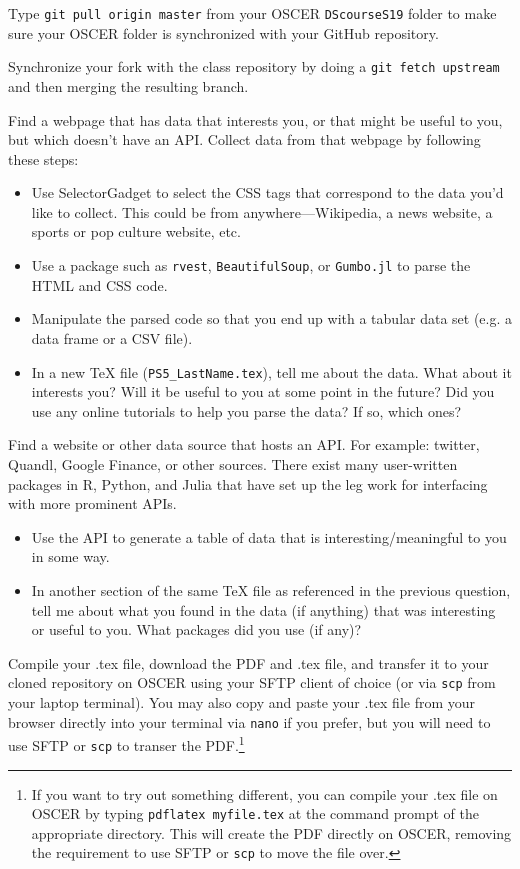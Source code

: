 \documentclass[12pt,english]{exam}
\begin{document}
\begin{questions}
\question Type \texttt{git pull origin master} from your OSCER \texttt{DScourseS19} folder to make sure your OSCER folder is synchronized with your GitHub repository. 

\question Synchronize your fork with the class repository by doing a \texttt{git fetch upstream} and then merging the resulting branch. 

\question Find a webpage that has data that interests you, or that might be useful to you, but which doesn't have an API. Collect data from that webpage by following these steps:
\begin{itemize}
    \item Use SelectorGadget to select the CSS tags that correspond to the data you'd like to collect. This could be from anywhere---Wikipedia, a news website, a sports or pop culture website, etc.
    \item Use a package such as \texttt{rvest}, \texttt{BeautifulSoup}, or \texttt{Gumbo.jl} to parse the HTML and CSS code.
    \item Manipulate the parsed code so that you end up with a tabular data set (e.g. a data frame or a CSV file).
    \item In a new TeX file (\texttt{PS5\_LastName.tex}), tell me about the data. What about it interests you? Will it be useful to you at some point in the future? Did you use any online tutorials to help you parse the data? If so, which ones?
\end{itemize}

\question Find a website or other data source that hosts an API. For example: twitter, Quandl, Google Finance, or other sources. There exist many user-written packages in R, Python, and Julia that have set up the leg work for interfacing with more prominent APIs. 
\begin{itemize}
    \item Use the API to generate a table of data that is interesting/meaningful to you in some way.
    \item In another section of the same TeX file as referenced in the previous question, tell me about what you found in the data (if anything) that was interesting or useful to you. What packages did you use (if any)?
\end{itemize}

\question Compile your .tex file, download the PDF and .tex file, and transfer it to your cloned repository on OSCER using your SFTP client of choice (or via \texttt{scp} from your laptop terminal). You may also copy and paste your .tex file from your browser directly into your terminal via \texttt{nano} if you prefer, but you will need to use SFTP or \texttt{scp} to transer the PDF.\footnote{If you want to try out something different, you can compile your .tex file on OSCER by typing \texttt{pdflatex myfile.tex} at the command prompt of the appropriate directory. This will create the PDF directly on OSCER, removing the requirement to use SFTP or \texttt{scp} to move the file over.}


\end{questions}
\end{document}
